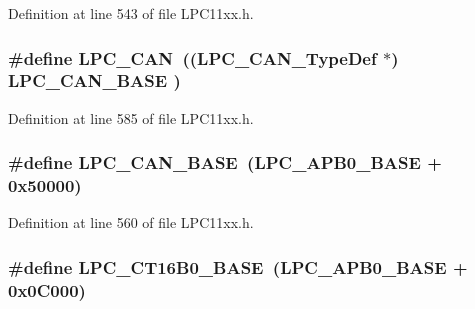 Definition at line 543 of file L\+P\+C11xx.\+h.

\subsubsection[{\texorpdfstring{L\+P\+C\+\_\+\+C\+AN}{LPC_CAN}}]{\setlength{\rightskip}{0pt plus 5cm}\#define L\+P\+C\+\_\+\+C\+AN~(({\bf L\+P\+C\+\_\+\+C\+A\+N\+\_\+\+Type\+Def}    $\ast$) {\bf L\+P\+C\+\_\+\+C\+A\+N\+\_\+\+B\+A\+SE}   )}\hypertarget{group___l_p_c11xx___definitions_ga177aa5b075c24ed459e92f4698bea9cc}{}\label{group___l_p_c11xx___definitions_ga177aa5b075c24ed459e92f4698bea9cc}


Definition at line 585 of file L\+P\+C11xx.\+h.

\subsubsection[{\texorpdfstring{L\+P\+C\+\_\+\+C\+A\+N\+\_\+\+B\+A\+SE}{LPC_CAN_BASE}}]{\setlength{\rightskip}{0pt plus 5cm}\#define L\+P\+C\+\_\+\+C\+A\+N\+\_\+\+B\+A\+SE~({\bf L\+P\+C\+\_\+\+A\+P\+B0\+\_\+\+B\+A\+SE} + 0x50000)}\hypertarget{group___l_p_c11xx___definitions_gaeae0f80f43f37b41a8a1c3cb7028d22f}{}\label{group___l_p_c11xx___definitions_gaeae0f80f43f37b41a8a1c3cb7028d22f}


Definition at line 560 of file L\+P\+C11xx.\+h.

\subsubsection[{\texorpdfstring{L\+P\+C\+\_\+\+C\+T16\+B0\+\_\+\+B\+A\+SE}{LPC_CT16B0_BASE}}]{\setlength{\rightskip}{0pt plus 5cm}\#define L\+P\+C\+\_\+\+C\+T16\+B0\+\_\+\+B\+A\+SE~({\bf L\+P\+C\+\_\+\+A\+P\+B0\+\_\+\+B\+A\+SE} + 0x0\+C000)}\hypertarget{group___l_p_c11xx___definitions_ga663c7a2d9c286efce1fd9c90c0068dac}{}\label{group___l_p_c11xx___definitions_ga663c7a2d9c286efce1fd9c90c0068dac}



